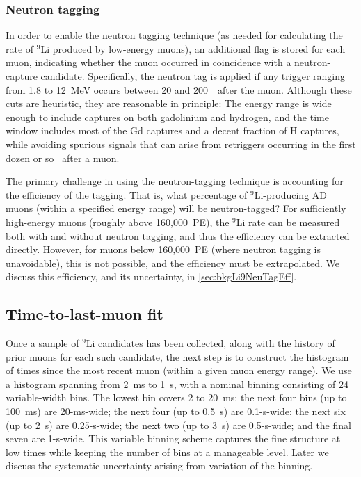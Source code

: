 \documentclass[../thesis.tex]{subfiles}
\begin{document}
\subsubsection{Neutron tagging}
\label{sec:bkgLi9NeuTag}

In order to enable the neutron tagging technique (as needed for calculating the rate of $^9$Li produced by low-energy muons), an additional flag is stored for each muon, indicating whether the muon occurred in coincidence with a neutron-capture candidate. Specifically, the neutron tag is applied if any trigger ranging from 1.8 to 12~MeV
occurs between 20 and 200~\us\ after the muon. Although these cuts are heuristic, they are reasonable in principle: The energy range is wide enough to include captures on both gadolinium and hydrogen, and the time window includes most of the Gd captures and a decent fraction of H captures, while avoiding spurious signals that can arise from retriggers occurring in the first dozen or so \us\ after a muon.

The primary challenge in using the neutron-tagging technique is accounting for the efficiency of the tagging. That is, what percentage of $^9$Li-producing AD muons (within a specified energy range) will be neutron-tagged? For sufficiently high-energy muons (roughly above 160,000~PE), the $^9$Li rate can be measured both with and without neutron tagging, and thus the efficiency can be extracted directly. However, for muons below 160,000~PE (where neutron tagging is unavoidable), this is not possible, and the efficiency must be extrapolated. We discuss this efficiency, and its uncertainty, in \autoref{sec:bkgLi9NeuTagEff}.

\subsection{Time-to-last-muon fit}
\label{sec:bkgLi9HistoFit}

Once a sample of $^9$Li candidates has been collected, along with the history of prior muons for each such candidate, the next step is to construct the histogram of times since the most recent muon (within a given muon energy range). We use a histogram spanning from 2~ms to 1~s, with a nominal binning consisting of 24 variable-width bins. The lowest bin covers 2 to 20~ms; the next four bins (up to 100~ms) are 20-ms-wide; the next four (up to 0.5~s) are 0.1-s-wide; the next six (up to 2~s) are 0.25-s-wide; the next two (up to 3~s) are 0.5-s-wide; and the final seven are 1-s-wide. This variable binning scheme captures the fine structure at low times while keeping the number of bins at a manageable level. Later we discuss the systematic uncertainty arising from variation of the binning.
\end{document}
